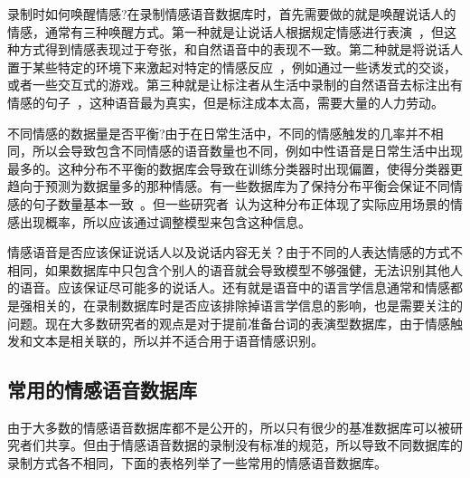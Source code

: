 录制时如何唤醒情感?在录制情感语音数据库时，首先需要做的就是唤醒说话人的情感，通常有三种唤醒方式。第一种就是让说话人根据规定情感进行表演~\cite{Lee2005Toward}，但这种方式得到情感表现过于夸张，和自然语音中的表现不一致。第二种就是将说话人置于某些特定的环境下来激起对特定的情感反应~\cite{Batliner2000Desperately}，例如通过一些诱发式的交谈，或者一些交互式的游戏。第三种就是让标注者从生活中录制的自然语音去标注出有情感的句子~\cite{Johnstone2005Affective}，这种语音最为真实，但是标注成本太高，需要大量的人力劳动。

不同情感的数据量是否平衡?由于在日常生活中，不同的情感触发的几率并不相同，所以会导致包含不同情感的语音数量也不同，例如中性语音是日常生活中出现最多的。这种分布不平衡的数据库会导致在训练分类器时出现偏置，使得分类器更趋向于预测为数据量多的那种情感。有一些数据库为了保持分布平衡会保证不同情感的句子数量基本一致~\cite{Burkhardt2005A}。但一些研究者~\cite{Hansen1997Getting, Morrison2007Ensemble}认为这种分布正体现了实际应用场景的情感出现概率，所以应该通过调整模型来包含这种信息。

情感语音是否应该保证说话人以及说话内容无关？由于不同的人表达情感的方式不相同，如果数据库中只包含个别人的语音就会导致模型不够强健，无法识别其他人的语音。应该保证尽可能多的说话人。还有就是语音中的语言学信息通常和情感都是强相关的，在录制数据库时是否应该排除掉语言学信息的影响，也是需要关注的问题。现在大多数研究者的观点是对于提前准备台词的表演型数据库，由于情感触发和文本是相关联的，所以并不适合用于语音情感识别。

\subsection{常用的情感语音数据库}
\label{ssec:available_database}
由于大多数的情感语音数据库都不是公开的，所以只有很少的基准数据库可以被研究者们共享。但由于情感语音数据的录制没有标准的规范，所以导致不同数据库的录制方式各不相同，下面的表格列举了一些常用的情感语音数据库。

